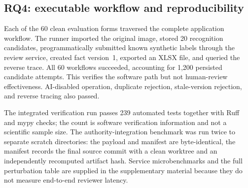 \FloatBarrier
\subsection{RQ4: executable workflow and reproducibility}
Each of the 60 clean evaluation forms traversed the complete application workflow. The runner imported the original image, stored 20 recognition candidates, programmatically submitted known synthetic labels through the review service, created fact version~1, exported an XLSX file, and queried the reverse trace. All 60 workflows succeeded, accounting for 1,200 persisted candidate attempts. This verifies the software path but not human-review effectiveness. AI-disabled operation, duplicate rejection, stale-version rejection, and reverse tracing also passed.

The integrated verification run passes 239 automated tests together with Ruff and mypy checks; the count is software verification information and not a scientific sample size. The authority-integration benchmark was run twice to separate scratch directories: the payload and manifest are byte-identical, the manifest records the final source commit with a clean worktree and an independently recomputed artifact hash. Service microbenchmarks and the full perturbation table are supplied in the supplementary material because they do not measure end-to-end reviewer latency.
